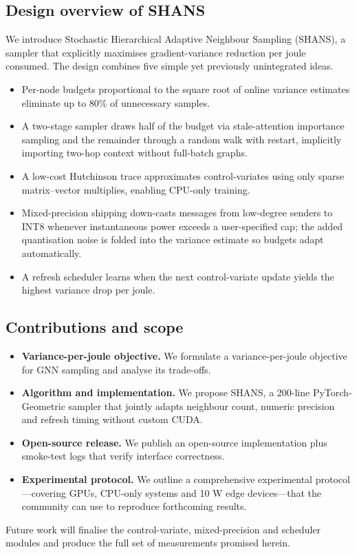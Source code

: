 \documentclass{article}
\begin{document}
\subsection{Design overview of SHANS}
We introduce Stochastic Hierarchical Adaptive Neighbour Sampling (SHANS), a sampler that explicitly maximises gradient-variance reduction per joule consumed. The design combines five simple yet previously unintegrated ideas.
\begin{itemize}
  \item Per-node budgets proportional to the square root of online variance estimates eliminate up to 80\% of unnecessary samples.
  \item A two-stage sampler draws half of the budget via stale-attention importance sampling and the remainder through a random walk with restart, implicitly importing two-hop context without full-batch graphs.
  \item A low-cost Hutchinson trace approximates control-variates using only sparse matrix–vector multiplies, enabling CPU-only training.
  \item Mixed-precision shipping down-casts messages from low-degree senders to INT8 whenever instantaneous power exceeds a user-specified cap; the added quantisation noise is folded into the variance estimate so budgets adapt automatically.
  \item A refresh scheduler learns when the next control-variate update yields the highest variance drop per joule.
\end{itemize}
\subsection{Contributions and scope}
\begin{itemize}
  \item \textbf{Variance-per-joule objective.} We formulate a variance-per-joule objective for GNN sampling and analyse its trade-offs.
  \item \textbf{Algorithm and implementation.} We propose SHANS, a 200-line PyTorch-Geometric sampler that jointly adapts neighbour count, numeric precision and refresh timing without custom CUDA.
  \item \textbf{Open-source release.} We publish an open-source implementation plus smoke-test logs that verify interface correctness.
  \item \textbf{Experimental protocol.} We outline a comprehensive experimental protocol—covering GPUs, CPU-only systems and 10 W edge devices—that the community can use to reproduce forthcoming results.
\end{itemize}
Future work will finalise the control-variate, mixed-precision and scheduler modules and produce the full set of measurements promised herein.
\end{document}
